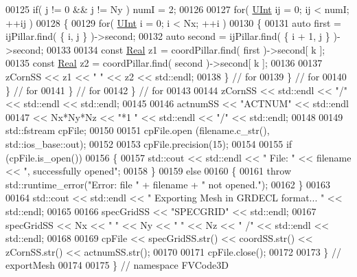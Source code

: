 \begin{DoxyCode}
00125                 \textcolor{keywordflow}{if}( j != 0 && j != Ny ) numI = 2;
00126 
00127                 \textcolor{keywordflow}{for}( \hyperlink{namespaceFVCode3D_a4bf7e328c75d0fd504050d040ebe9eda}{UInt} ij = 0; ij < numI; ++ij )
00128                 \{
00129                     \textcolor{keywordflow}{for}( \hyperlink{namespaceFVCode3D_a4bf7e328c75d0fd504050d040ebe9eda}{UInt} i = 0; i < Nx; ++i )
00130                     \{
00131                         \textcolor{keyword}{auto} first = ijPillar.find( \{ i, j \} )->second;
00132                         \textcolor{keyword}{auto} second = ijPillar.find( \{ i + 1, j \} )->second;
00133 
00134                         \textcolor{keyword}{const} \hyperlink{namespaceFVCode3D_a40c1f5588a248569d80aa5f867080e83}{Real} z1 = coordPillar.find( first )->second[ k ];
00135                         \textcolor{keyword}{const} \hyperlink{namespaceFVCode3D_a40c1f5588a248569d80aa5f867080e83}{Real} z2 = coordPillar.find( second )->second[ k ];
00136 
00137                         zCornSS << z1 << \textcolor{stringliteral}{" "} << z2 << std::endl;
00138                     \} \textcolor{comment}{// for}
00139                 \} \textcolor{comment}{// for}
00140             \} \textcolor{comment}{// for}
00141         \} \textcolor{comment}{// for}
00142     \} \textcolor{comment}{// for}
00143 
00144     zCornSS << std::endl << \textcolor{stringliteral}{"/"} << std::endl << std::endl;
00145 
00146     actnumSS << \textcolor{stringliteral}{"ACTNUM"} << std::endl
00147              << Nx*Ny*Nz << \textcolor{stringliteral}{"*1 "} << std::endl << \textcolor{stringliteral}{"/"} << std::endl;
00148 
00149     std::fstream cpFile;
00150 
00151     cpFile.open (filename.c\_str(), std::ios\_base::out);
00152 
00153     cpFile.precision(15);
00154 
00155     \textcolor{keywordflow}{if} (cpFile.is\_open())
00156     \{
00157         std::cout << std::endl << \textcolor{stringliteral}{" File: "} << filename << \textcolor{stringliteral}{", successfully opened"};
00158     \}
00159     \textcolor{keywordflow}{else}
00160     \{
00161         \textcolor{keywordflow}{throw} std::runtime\_error(\textcolor{stringliteral}{"Error: file "} + filename + \textcolor{stringliteral}{" not opened."});
00162     \}
00163 
00164     std::cout << std::endl << \textcolor{stringliteral}{" Exporting Mesh in GRDECL format... "} << std::endl;
00165 
00166     specGridSS << \textcolor{stringliteral}{"SPECGRID"} << std::endl;
00167     specGridSS << Nx << \textcolor{stringliteral}{" "} << Ny << \textcolor{stringliteral}{" "} << Nz << \textcolor{stringliteral}{" /"} << std::endl << std::endl;
00168 
00169     cpFile << specGridSS.str() << coordSS.str() << zCornSS.str() << actnumSS.str();
00170 
00171     cpFile.close();
00172 
00173 \} \textcolor{comment}{// exportMesh}
00174 
00175 \} \textcolor{comment}{// namespace FVCode3D}
\end{DoxyCode}

